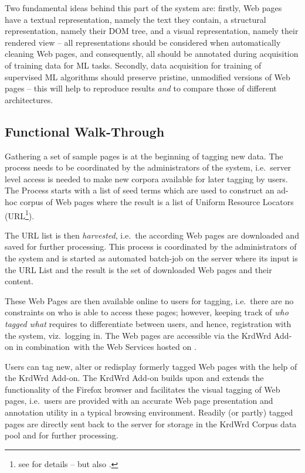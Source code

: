 \begin{longversion}
%
%
Two fundamental ideas behind this part of the system are:
firstly, Web pages have a textual representation, namely the text they contain, a structural representation, namely their DOM tree, and a visual representation, namely their rendered view -- all representations should be considered when automatically cleaning Web pages, and consequently, all should be annotated during acquisition of training data for ML tasks.
Secondly, data acquisition for training of supervised ML algorithms should preserve pristine, unmodified versions of Web pages -- this will help to reproduce results \emph{and} to compare those of different architectures.

\subsection{Functional Walk-Through}

Gathering a set of sample pages is at the beginning of tagging new data. 
The process needs to be coordinated by the administrators of the system, i.e.~server level access is needed to make new corpora available for later tagging by users. 
The Process starts with a list of seed terms which are used to construct an ad-hoc corpus of Web pages where the result is a list of Uniform Resource Locators (URL\footnote{see \cite{URL} for details -- but also \cite{w3.org/Addressing}.}).  
 
The URL list is then \emph{harvested}, i.e.~the according Web pages are downloaded and saved for further processing. 
This process is coordinated by the administrators of the system and is started as automated batch-job on the server where its input is the URL List and the result is the set of downloaded Web pages and their content.

These Web Pages are then available online to users for tagging, i.e.~there are no constraints on who is able to access these pages; 
however, keeping track of \emph{who tagged what} requires to differentiate between users, and hence, registration with the system, viz.~logging in. 
The Web pages are accessible via the KrdWrd Add-on in combination\footnotemark~with the Web Services hosted on \cite[Web Site]{krdwrd.org}.

Users can tag new, alter or redisplay formerly tagged Web pages with the help of the KrdWrd Add-on.
The KrdWrd Add-on builds upon and extends the functionality of the Firefox \cite{firefox} browser and facilitates the visual tagging of Web pages, i.e.~users are provided with an accurate Web page presentation and annotation utility in a typical browsing environment.
Readily (or partly) tagged pages are directly sent back to the server for storage in the KrdWrd Corpus data pool and for further processing.  


\end{longversion}

